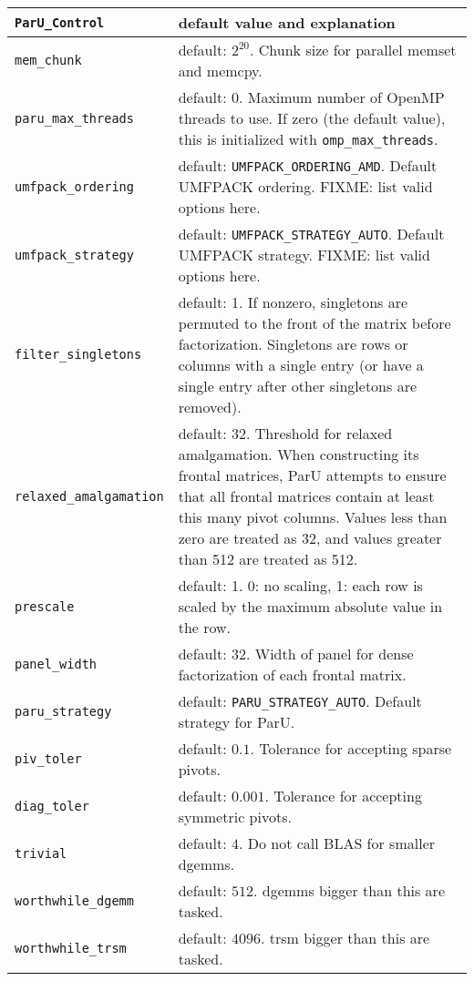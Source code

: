 \documentclass[12pt]{article}
\begin{document}
    \vspace{0.1in}
    {\footnotesize
    \begin{tabular}{|lp{4in}|}
    \hline
    \verb'ParU_Control' & default value and explanation  \\
    \hline\hline
    \verb'mem_chunk' & default: $2^{20}$. Chunk size for parallel memset and
        memcpy. \\
    \verb'paru_max_threads' & default: $0$.  Maximum number of OpenMP threads
        to use.  If zero (the default value), this is initialized with
        \verb'omp_max_threads'. \\
    \hline
    \verb'umfpack_ordering' & default: \verb'UMFPACK_ORDERING_AMD'.
        Default UMFPACK ordering.
        FIXME: list valid options here.
        \\
    \verb'umfpack_strategy' & default: \verb'UMFPACK_STRATEGY_AUTO'.
        Default UMFPACK strategy.
        FIXME: list valid options here.
        \\
    \verb'filter_singletons' & default: 1. If nonzero, singletons are
        permuted to the front of the matrix before factorization.  Singletons
        are rows or columns with a single entry (or have a single entry after
        other singletons are removed). \\
    \verb'relaxed_amalgamation' & default: 32. Threshold for relaxed
        amalgamation. When constructing its frontal matrices, ParU attempts to
        ensure that all frontal matrices contain at least this many pivot
        columns.  Values less than zero are treated as 32, and values greater
        than 512 are treated as 512. \\
    \hline
    \verb'prescale' & default: 1. 0: no scaling,
        1: each row is scaled by the maximum
        absolute value in the row. \\
    \verb'panel_width' & default: 32. Width of panel for dense factorization of
        each frontal matrix. \\
    \verb'paru_strategy' & default: \verb'PARU_STRATEGY_AUTO'. Default strategy
        for ParU. \\
    \verb'piv_toler' & default: $0.1$. Tolerance for accepting sparse pivots. \\
    \verb'diag_toler' & default: $0.001$. Tolerance for accepting symmetric
        pivots. \\
    \verb'trivial' & default: $4$. Do not call BLAS for smaller dgemms. \\
    \verb'worthwhile_dgemm' & default: $512$. dgemms bigger than this are
        tasked. \\
    \verb'worthwhile_trsm' & default: $4096$. trsm bigger than this are
        tasked.  \\
    \hline
    \end{tabular}
    }
    \vspace{0.1in}
\end{document}
